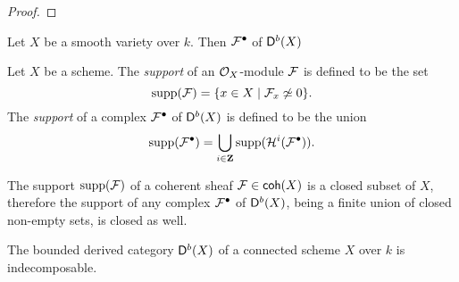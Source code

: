 \begin{proof}
    
\end{proof}

\begin{proposition}
    Let $X$ be a smooth variety over $k$. Then  $\mathcal F^\bullet$ of $\mathsf{D}^b(X)$ 
\end{proposition}

\begin{definition}
    \label{Definition of support}
    Let $X$ be a scheme. The \emph{support} of an ${\mathcal{O}_{X}}$-module $\mathcal F$ is defined to be the set
    \[
        \operatorname{supp}(\mathcal F) = \{x \in X \mid \mathcal F_x \not\simeq 0 \}.
    \] 
    The \emph{support} of a complex $\mathcal F^\bullet$ of $\mathsf{D}^b(X)$ is defined to be the union
    \[
        \operatorname{supp}(\mathcal F^\bullet) = \bigcup_{i \in \mathbf Z} \operatorname{supp}(\mathcal H^i(\mathcal F^\bullet)).
    \]
\end{definition}

\begin{remark}
    \label{supports closed}
    The support $\operatorname{supp}(\mathcal F)$ of a coherent sheaf $\mathcal F \in \mathsf{coh}(X)$ is a closed subset of $X$, therefore the support of any complex $\mathcal F^\bullet$ of $\mathsf{D}^b(X)$, being a finite union of closed non-empty sets, is closed as well.
\end{remark}

\begin{theorem}
    \label{Db(X) indecomposable for X connected}
    The bounded derived category $\mathsf{D}^b(X)$ of a connected scheme $X$ over $k$ is indecomposable.
\end{theorem}

